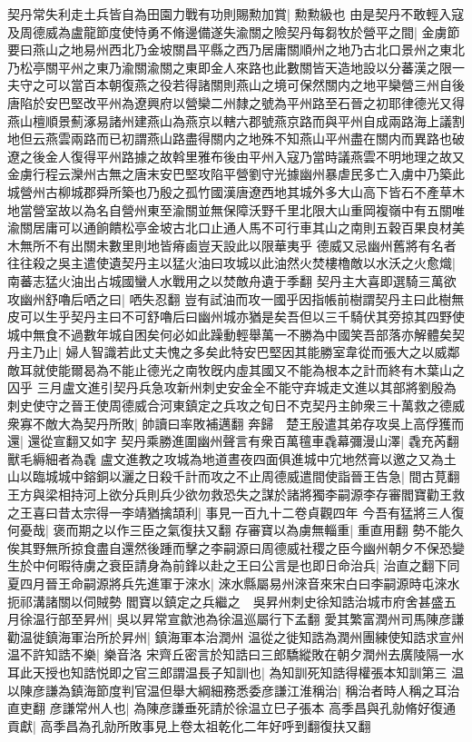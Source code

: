契丹常失利走土兵皆自為田園力戰有功則賜勲加賞|{
	勲勲級也}
由是契丹不敢輕入寇及周德威為盧龍節度使恃勇不脩邊備遂失渝關之險契丹每芻牧於營平之間|{
	金虜節要曰燕山之地易州西北乃金坡關昌平縣之西乃居庸關順州之地乃古北口景州之東北乃松亭關平州之東乃渝關渝關之東即金人來路也此數關皆天造地設以分蕃漢之限一夫守之可以當百本朝復燕之役若得諸關則燕山之境可保然關内之地平欒營三州自後唐陷於安巴堅改平州為遼興府以營欒二州隸之號為平州路至石晉之初耶律德光又得燕山檀順景薊涿易諸州建燕山為燕京以轄六郡號燕京路而與平州自成兩路海上議割地但云燕雲兩路而已初謂燕山路盡得關内之地殊不知燕山平州盡在關内而異路也破遼之後金人復得平州路據之故斡里雅布後由平州入寇乃當時議燕雲不明地理之故又金虜行程云灤州古無之唐末安巴堅攻陷平營劉守光據幽州暴虐民多亡入虜中乃築此城營州古柳城郡舜所築也乃殷之孤竹國漢唐遼西地其城外多大山高下皆石不產草木地當營室故以為名自營州東至渝關並無保障沃野千里北限大山重岡複嶺中有五關唯渝關居庸可以通餉饋松亭金坡古北口止通人馬不可行車其山之南則五穀百果良材美木無所不有出關未數里則地皆瘠鹵豈天設此以限華夷乎}
德威又忌幽州舊將有名者往往殺之吳主遣使遺契丹主以猛火油曰攻城以此油然火焚樓櫓敵以水沃之火愈熾|{
	南蕃志猛火油出占城國蠻人水戰用之以焚敵舟遺于季翻}
契丹主大喜即選騎三萬欲攻幽州舒嚕后哂之曰|{
	哂失忍翻}
豈有試油而攻一國乎因指帳前樹謂契丹主曰此樹無皮可以生乎契丹主曰不可舒嚕后曰幽州城亦猶是矣吾但以三千騎伏其旁掠其四野使城中無食不過數年城自困矣何必如此躁動輕舉萬一不勝為中國笑吾部落亦解體矣契丹主乃止|{
	婦人智識若此丈夫愧之多矣此特安巴堅因其能勝室韋從而張大之以威鄰敵耳就使能爾曷為不能止德光之南牧旣内虛其國又不能為根本之計而終有木葉山之囚乎}
三月盧文進引契丹兵急攻新州刺史安金全不能守弃城走文進以其部將劉殷為刺史使守之晉王使周德威合河東鎮定之兵攻之旬日不克契丹主帥衆三十萬救之德威衆寡不敵大為契丹所敗|{
	帥讀曰率敗補邁翻}
奔歸　楚王殷遣其弟存攻吳上高俘獲而還|{
	還從宣翻又如字}
契丹乘勝進圍幽州聲言有衆百萬氊車毳幕彌漫山澤|{
	毳充芮翻獸毛縟細者為毳}
盧文進教之攻城為地道晝夜四面俱進城中宂地然膏以邀之又為土山以臨城城中鎔銅以灑之日殺千計而攻之不止周德威遣間使詣晉王告急|{
	間古莧翻}
王方與梁相持河上欲分兵則兵少欲勿救恐失之謀於諸將獨李嗣源李存審閻寶勸王救之王喜曰昔太宗得一李靖猶擒頡利|{
	事見一百九十二卷貞觀四年}
今吾有猛將三人復何憂哉|{
	褒而期之以作三臣之氣復扶又翻}
存審寶以為虜無輜重|{
	重直用翻}
勢不能久俟其野無所掠食盡自還然後踵而擊之李嗣源曰周德威社稷之臣今幽州朝夕不保恐變生於中何暇待虜之衰臣請身為前鋒以赴之王曰公言是也即日命治兵|{
	治直之翻下同}
夏四月晉王命嗣源將兵先進軍于淶水|{
	淶水縣屬易州淶音來宋白曰李嗣源時屯淶水扼祁溝諸關以伺賊勢}
閻寶以鎮定之兵繼之　吳昇州刺史徐知誥治城市府舍甚盛五月徐温行部至昇州|{
	吳以昇常宣歙池為徐温巡屬行下孟翻}
愛其繁富潤州司馬陳彦謙勸温徙鎮海軍治所於昇州|{
	鎮海軍本治潤州}
温從之徙知誥為潤州團練使知誥求宣州温不許知誥不樂|{
	樂音洛}
宋齊丘密言於知誥曰三郎驕縱敗在朝夕潤州去廣陵隔一水耳此天授也知誥悦即之官三郎謂温長子知訓也|{
	為知訓死知誥得權張本知訓第三}
温以陳彦謙為鎮海節度判官温但舉大綱細務悉委彦謙江淮稱治|{
	稱治者時人稱之耳治直吏翻}
彦謙常州人也|{
	為陳彦謙垂死請於徐温立巳子張本}
高季昌與孔勍脩好復通貢獻|{
	高季昌為孔勍所敗事見上卷太祖乾化二年好呼到翻復扶又翻}


